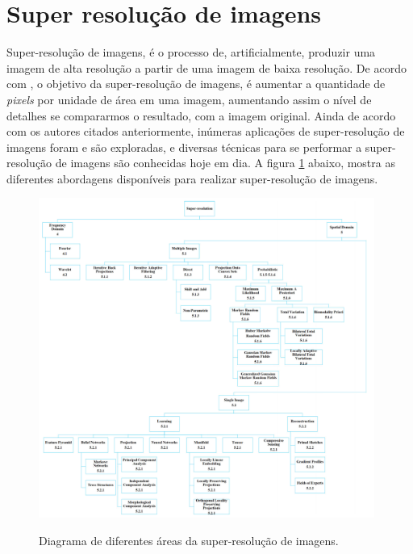 \section{Super resolução de imagens}
\label{sec:sisr}

Super-resolução de imagens, é o processo de, artificialmente, produzir uma imagem de alta resolução a partir de uma imagem de baixa resolução. De acordo com , o objetivo da super-resolução de imagens, é aumentar a quantidade de \textit{pixels} por unidade de área em uma imagem, aumentando assim o nível de detalhes se compararmos o resultado, com a imagem original. Ainda de acordo com os autores citados anteriormente, inúmeras aplicações de super-resolução de imagens foram e são exploradas, e diversas técnicas para se performar a super-resolução de imagens são conhecidas hoje em dia. A figura \ref{fig:super-resolucao:fig11} abaixo, mostra as diferentes abordagens disponíveis para realizar super-resolução de imagens. 

\begin{figure}
    \centering
    \caption{Diagrama de diferentes áreas da super-resolução de imagens.}
    \includegraphics[width=11cm]{fig/SR-Taxidermy.png}
    \label{fig:super-resolucao:fig11}
\end{figure}

